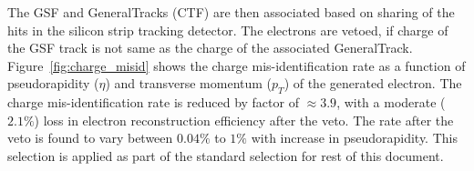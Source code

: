 The GSF and GeneralTracks (CTF) are then associated based on sharing of the hits in the silicon strip tracking detector. 
The electrons are vetoed, if charge of the GSF track is not same as the charge of the associated 
GeneralTrack. Figure~\ref{fig:charge_misid} shows the charge mis-identification rate as a function of 
pseudorapidity ($\eta$) and transverse momentum ($p_T$) of the generated electron. The charge mis-identification rate
is reduced by factor of $\approx 3.9$, with a moderate ($2.1\%$)  loss in electron reconstruction efficiency after the veto. 
The rate after the veto is found to vary between $0.04\%$ to $1\%$ with increase in pseudorapidity. This selection is 
applied as part of the standard selection for rest of this document.
